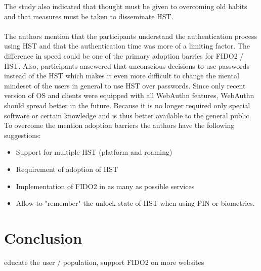 \documentclass[runningheads]{llncs}
\begin{document}
The study also indicated that thought must be given to overcoming old habits and that measures must be taken to disseminate HST.

\paragraph{}
The authors mention that the participants understand the authentication process using HST and that the authentication time was more of a limiting factor. The difference in speed could be one of the primary adoption barries for FIDO2 / HST. Also, participants ansewered that unconscious decisions to use passwords instead of the HST which makes it even more difficult to change the mental mindeset of the users in general to use HST over passwords. Since only recent version of OS and clients were equipped with all WebAuthn features, WebAuthn should spread better in the future. Because it is no longer required only special software or certain knowledge and is thus better available to the general public. To overcome the mention adoption barriers the authors have the following suggestions:
\begin{itemize}
  \item Support for multiple HST (platform and roaming)
  \item Requirement of adoption of HST
  \item Implementation of FIDO2 in as many as possible services
  \item Allow to "remember" the unlock state of HST when using PIN or biometrics.
\end{itemize}
\cite{255646}
\section{Conclusion}
educate the user / population, support FIDO2 on more websites


\end{document}
